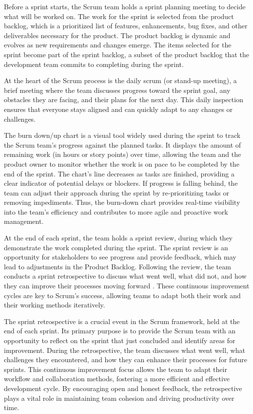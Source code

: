 Before a sprint starts, the Scrum team holds a sprint planning meeting to decide what will
be worked on. The work for the sprint is selected from the product backlog, which is a
prioritized list of features, enhancements, bug fixes, and other deliverables necessary
for the product\nocite{schwaber2020scrum}. The product backlog is dynamic and evolves as
new requirements and changes emerge. The items selected for the sprint become part of the
sprint backlog, a subset of the product backlog that the development team commits to
completing during the sprint.

At the heart of the Scrum process is the daily scrum (or stand-up meeting), a brief
meeting where the team discusses progress toward the sprint goal, any obstacles they are
facing, and their plans for the next day. This daily inspection ensures that everyone
stays aligned and can quickly adapt to any changes or challenges\nocite{cobb2015scrum}.

The burn down/up chart is a visual tool widely used during the sprint to track the Scrum
team's progress against the planned tasks. It displays the amount of remaining work (in
hours or story points) over time, allowing the team and the product owner to monitor
whether the work is on pace to be completed by the end of the sprint. The chart's line
decreases as tasks are finished, providing a clear indicator of potential delays or
blockers. If progress is falling behind, the team can adjust their approach during the
sprint by re-prioritizing tasks or removing impediments. Thus, the burn-down chart provides
real-time visibility into the team’s efficiency and contributes to more agile and
proactive work management.

At the end of each sprint, the team holds a sprint review, during which they demonstrate
the work completed during the sprint. The sprint review is an opportunity for stakeholders
to see progress and provide feedback, which may lead to adjustments in the Product
Backlog. Following the review, the team conducts a sprint retrospective to discuss what
went well, what did not, and how they can improve their processes moving forward%
\nocite{rubin2012sprints}. These continuous improvement cycles are key to Scrum's success,
allowing teams to adapt both their work and their working methods iteratively.

The sprint retrospective is a crucial event in the Scrum framework, held at the end of
each sprint. Its primary purpose is to provide the Scrum team with an opportunity to
reflect on the sprint that just concluded and identify areas for improvement. During the
retrospective, the team discusses what went well, what challenges they encountered, and
how they can enhance their processes for future sprints. This continuous improvement focus
allows the team to adapt their workflow and collaboration methods, fostering a more
efficient and effective development cycle. By encouraging open and honest feedback, the
retrospective plays a vital role in maintaining team cohesion and driving productivity
over time.

